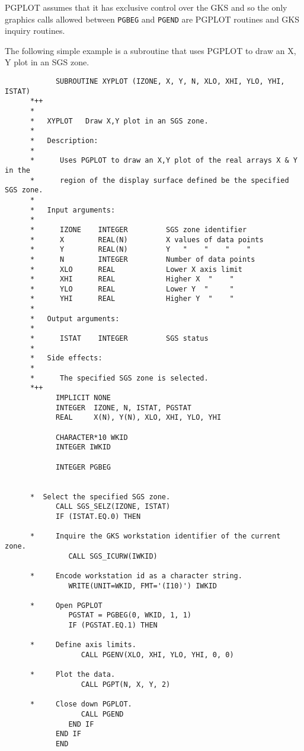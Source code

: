 \documentclass[twoside,11pt]{article}
\renewcommand{\_}{\texttt{\symbol{95}}}
\begin{document}
PGPLOT assumes that it has exclusive control over the GKS and so the only
graphics calls allowed between \texttt{PGBEG} and \texttt{PGEND} are PGPLOT
routines and GKS inquiry routines. 

The following simple example is a subroutine that uses PGPLOT to draw an X, Y
plot in an SGS zone.
\begin{small}
\begin{verbatim}
            SUBROUTINE XYPLOT (IZONE, X, Y, N, XLO, XHI, YLO, YHI, ISTAT)
      *++
      *
      *   XYPLOT   Draw X,Y plot in an SGS zone.
      *
      *   Description:
      *                                                                      
      *      Uses PGPLOT to draw an X,Y plot of the real arrays X & Y in the 
      *      region of the display surface defined be the specified SGS zone.
      *
      *   Input arguments:
      *
      *      IZONE    INTEGER         SGS zone identifier
      *      X        REAL(N)         X values of data points
      *      Y        REAL(N)         Y   "    "    "    "
      *      N        INTEGER         Number of data points
      *      XLO      REAL            Lower X axis limit
      *      XHI      REAL            Higher X  "    "
      *      YLO      REAL            Lower Y  "     "
      *      YHI      REAL            Higher Y  "    "
      *
      *   Output arguments:
      *
      *      ISTAT    INTEGER         SGS status
      *
      *   Side effects:
      *
      *      The specified SGS zone is selected.
      *++
            IMPLICIT NONE
            INTEGER  IZONE, N, ISTAT, PGSTAT
            REAL     X(N), Y(N), XLO, XHI, YLO, YHI

            CHARACTER*10 WKID
            INTEGER IWKID

            INTEGER PGBEG


      *  Select the specified SGS zone.
            CALL SGS_SELZ(IZONE, ISTAT)
            IF (ISTAT.EQ.0) THEN

      *     Inquire the GKS workstation identifier of the current zone.
               CALL SGS_ICURW(IWKID)

      *     Encode workstation id as a character string.
               WRITE(UNIT=WKID, FMT='(I10)') IWKID

      *     Open PGPLOT
               PGSTAT = PGBEG(0, WKID, 1, 1)
               IF (PGSTAT.EQ.1) THEN

      *     Define axis limits.
                  CALL PGENV(XLO, XHI, YLO, YHI, 0, 0)

      *     Plot the data.
                  CALL PGPT(N, X, Y, 2)

      *     Close down PGPLOT.
                  CALL PGEND
               END IF
            END IF
            END
\end{verbatim}                                                         
\end{small}
\end{document}
